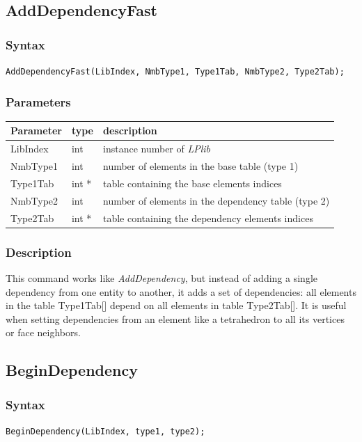 \documentclass[a4paper,12pt]{article}
\begin{document}
\subsection{AddDependencyFast}

\subsubsection*{Syntax}
\tt{AddDependencyFast(LibIndex, NmbType1, Type1Tab, NmbType2, Type2Tab);}
\normalfont

\subsubsection*{Parameters}
\begin{tabular}{|m{2cm}|m{1.5cm}|m{10.5cm}|}
\hline
Parameter  & type   & description \\
\hline
LibIndex   & int    & instance number of \emph{LPlib} \\
\hline
NmbType1   & int    & number of elements in the base table (type 1) \\
\hline
Type1Tab   & int *  & table containing the base elements indices \\
\hline
NmbType2   & int    & number of elements in the dependency table (type 2) \\
\hline
Type2Tab   & int *  & table containing the dependency elements indices \\
\hline
\end{tabular}

\subsubsection*{Description}
This command works like \emph{AddDependency}, but instead of adding a single dependency from one entity to another, it adds a set of dependencies: all elements in the table Type1Tab[] depend on all elements in table Type2Tab[]. It is useful when setting dependencies from an element like a tetrahedron to all its vertices or face neighbors.


\subsection{BeginDependency}

\subsubsection*{Syntax}
\tt{BeginDependency(LibIndex, type1, type2);}
\normalfont
\end{document}
